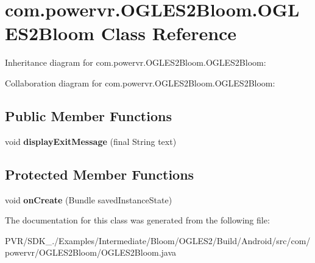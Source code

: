 \hypertarget{classcom_1_1powervr_1_1_o_g_l_e_s2_bloom_1_1_o_g_l_e_s2_bloom}{\section{com.\+powervr.\+O\+G\+L\+E\+S2\+Bloom.\+O\+G\+L\+E\+S2\+Bloom Class Reference}
\label{classcom_1_1powervr_1_1_o_g_l_e_s2_bloom_1_1_o_g_l_e_s2_bloom}
}


Inheritance diagram for com.\+powervr.\+O\+G\+L\+E\+S2\+Bloom.\+O\+G\+L\+E\+S2\+Bloom\+:


Collaboration diagram for com.\+powervr.\+O\+G\+L\+E\+S2\+Bloom.\+O\+G\+L\+E\+S2\+Bloom\+:
\subsection*{Public Member Functions}
\begin{DoxyCompactItemize}
\item 
\hypertarget{classcom_1_1powervr_1_1_o_g_l_e_s2_bloom_1_1_o_g_l_e_s2_bloom_ab33910f83617a3a2c75965684395380e}{void {\bfseries display\+Exit\+Message} (final String text)}\label{classcom_1_1powervr_1_1_o_g_l_e_s2_bloom_1_1_o_g_l_e_s2_bloom_ab33910f83617a3a2c75965684395380e}

\end{DoxyCompactItemize}
\subsection*{Protected Member Functions}
\begin{DoxyCompactItemize}
\item 
\hypertarget{classcom_1_1powervr_1_1_o_g_l_e_s2_bloom_1_1_o_g_l_e_s2_bloom_a68592fd785ef0c5925257b96354f6ec8}{void {\bfseries on\+Create} (Bundle saved\+Instance\+State)}\label{classcom_1_1powervr_1_1_o_g_l_e_s2_bloom_1_1_o_g_l_e_s2_bloom_a68592fd785ef0c5925257b96354f6ec8}

\end{DoxyCompactItemize}


The documentation for this class was generated from the following file\+:\begin{DoxyCompactItemize}
\item 
P\+V\+R/\+S\+D\+K\+\_./\+Examples/\+Intermediate/\+Bloom/\+O\+G\+L\+E\+S2/\+Build/\+Android/src/com/powervr/\+O\+G\+L\+E\+S2\+Bloom/O\+G\+L\+E\+S2\+Bloom.\+java\end{DoxyCompactItemize}
